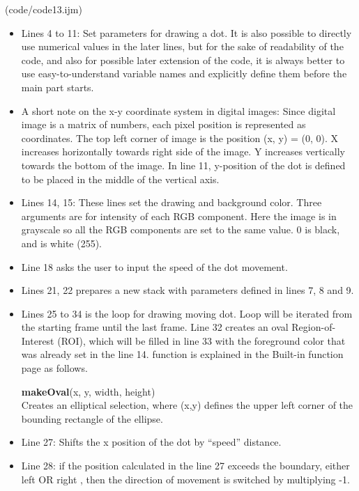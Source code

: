 (code/code13.ijm)

\begin{itemize}
\item Lines 4 to 11: Set parameters for drawing a dot. It is also possible to directly use numerical values in the later lines, but for the sake of readability of the code, and also for possible later extension of the code, it is always better to use easy-to-understand variable names and explicitly define them before the main part starts. 
\item A short note on the x-y coordinate system in digital images: Since digital image is a matrix of numbers, each pixel position is represented as coordinates. The top left corner of image is the position (x, y) = (0, 0). X increases horizontally towards right side of the image. Y increases vertically towards the bottom of the image.  In line 11, y-position of the dot is defined to be placed in the middle of the vertical axis. 
\item Lines 14, 15: These lines set the drawing and background color. Three arguments are for intensity of each RGB component. Here the image is in grayscale so all the RGB components are set to the same value. 0 is black, and  is white (255).
\item Line 18 asks the user to input the speed of the dot movement.
\item Lines 21, 22 prepares a new stack with parameters defined in lines 7, 8 and 9.
\item Lines 25 to 34 is the loop for drawing moving dot. Loop will be iterated from the starting frame until the last frame. Line 32 creates an oval Region-of-Interest (ROI), which will be filled in line 33 with the foreground color that was already set in the line 14.  function is explained in the Built-in function page as follows.

\begin{indentCom}
\textbf{makeOval}(x, y, width, height)\\
Creates an elliptical selection, where (x,y) defines the upper left corner of the bounding rectangle of the ellipse. 
\end{indentCom}
\item Line 27: Shifts the x position of the dot by ``speed'' distance. 
\item Line 28: if the position calculated in the line 27 exceeds the boundary, either left  OR right , then the direction of movement is switched by multiplying -1.
\end{itemize}

